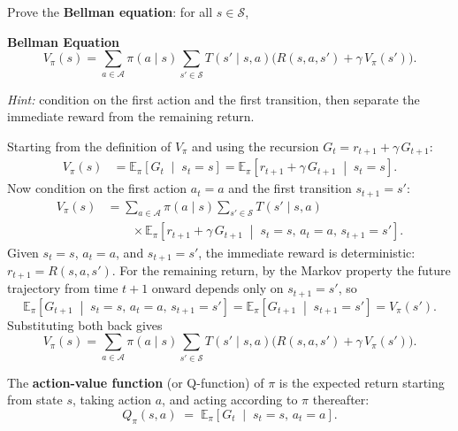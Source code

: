 \documentclass[11pt]{article}
\newcommand{\cS}{\mathcal{S}}
\newcommand{\cA}{\mathcal{A}}
\begin{document}
\begin{exercise}
\label{prob:bellman_proof} Prove the \textbf{Bellman equation}: for all $s \in \cS$,
\begin{callout}[note]
\textbf{Bellman Equation}
$$
V_\pi(s) = \sum_{a \in \cA} \pi(a \mid s) \sum_{s' \in \cS} T(s' \mid s, a)\bigl(R(s,a,s') + \gamma\, V_\pi(s')\bigr).
$$
\end{callout}
\textit{Hint:} condition on the first action and the first transition, then separate the immediate reward from the remaining return.
\end{exercise}

\begin{solution}
Starting from the definition of $V_\pi$ and using the recursion $G_t = r_{t+1} + \gamma\, G_{t+1}$:
\begin{align*}
V_\pi(s) &= \mathbb{E}_\pi\!\left[G_t \;\middle|\; s_t = s\right] = \mathbb{E}_\pi\!\left[r_{t+1} + \gamma\, G_{t+1} \;\middle|\; s_t = s\right].
\end{align*}
Now condition on the first action $a_t = a$ and the first transition $s_{t+1} = s'$:
\begin{align*}
V_\pi(s) &= \sum_{a \in \cA} \pi(a \mid s) \sum_{s' \in \cS} T(s' \mid s, a) \\
&\qquad \times \mathbb{E}_\pi\!\left[r_{t+1} + \gamma\, G_{t+1} \;\middle|\; s_t = s,\, a_t = a,\, s_{t+1} = s'\right].
\end{align*}
Given $s_t = s$, $a_t = a$, and $s_{t+1} = s'$, the immediate reward is deterministic: $r_{t+1} = R(s, a, s')$. For the remaining return, by the Markov property the future trajectory from time $t+1$ onward depends only on $s_{t+1} = s'$, so
$$
\mathbb{E}_\pi\!\left[G_{t+1} \;\middle|\; s_t = s,\, a_t = a,\, s_{t+1} = s'\right] = \mathbb{E}_\pi\!\left[G_{t+1} \;\middle|\; s_{t+1} = s'\right] = V_\pi(s').
$$
Substituting both back gives
$$
V_\pi(s) = \sum_{a \in \cA} \pi(a \mid s) \sum_{s' \in \cS} T(s' \mid s, a)\bigl(R(s,a,s') + \gamma\, V_\pi(s')\bigr).
$$
\end{solution}

\begin{definition}\label{def:q_function}
The \textbf{action-value function} (or Q-function) of $\pi$ is the expected return starting from state $s$, taking action $a$, and acting according to $\pi$ thereafter:
$$
Q_\pi(s,a) \;=\; \mathbb{E}_\pi\!\left[G_t \;\middle|\; s_t = s,\, a_t = a\right].
$$
\end{definition}
\end{document}

